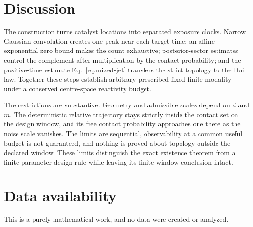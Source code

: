 \documentclass[aps,physrev,reprint,amsmath,amssymb,longbibliography,floatfix]{revtex4-2}
\begin{document}
\section{Discussion}
\label{sec:discussion}

The construction turns catalyst locations into separated exposure clocks.
Narrow Gaussian convolution creates one peak near each target time; an
affine-exponential zero bound makes the count exhaustive; posterior-sector
estimates control the complement after multiplication by the contact
probability; and the positive-time estimate
Eq.~\eqref{eq:mixed-jet} transfers the strict topology to the Doi law.
Together these steps establish arbitrary prescribed fixed finite modality
under a conserved centre-space reactivity budget.

The restrictions are substantive.  Geometry and admissible scales depend on
\(d\) and \(m\).  The deterministic relative trajectory stays strictly
inside the contact set on the design window, and its free contact probability
approaches one there as the noise scale vanishes.  The limits are sequential,
observability at a common useful budget is not guaranteed, and nothing is
proved about topology outside the declared window.  These limits distinguish
the exact existence theorem from a finite-parameter design rule while leaving
its finite-window conclusion intact.

\section*{Data availability}

This is a purely mathematical work, and no data were created or analyzed.

\nocite{grebenkov2020multiple}

\end{document}
